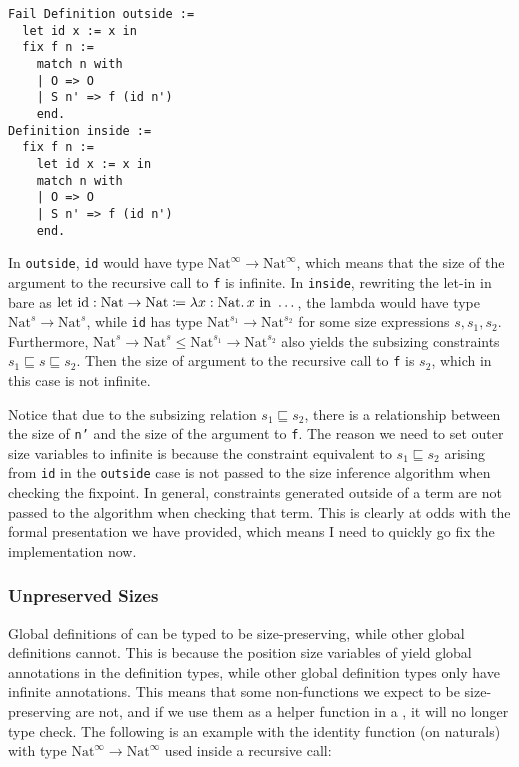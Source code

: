 \begin{verbatim}
Fail Definition outside :=
  let id x := x in
  fix f n :=
    match n with
    | O => O
    | S n' => f (id n')
    end.
Definition inside :=
  fix f n :=
    let id x := x in
    match n with
    | O => O
    | S n' => f (id n')
    end.
\end{verbatim}

In \texttt{outside}, \texttt{id} would have type $\text{Nat}^\infty \to \text{Nat}^\infty$, which means that the size of the argument to the recursive call to \texttt{f} is infinite.
In \texttt{inside}, rewriting the let-in in bare \lang as $\text{let}\ \text{id} : \text{Nat} \to \text{Nat} \coloneqq \lambda x : \text{Nat} \mathpunct{.} x\ \text{in}\ \dots$, the lambda would have type $\text{Nat}^{s} \to \text{Nat}^{s}$, while \texttt{id} has type $\text{Nat}^{s_1} \to \text{Nat}^{s_2}$ for some size expressions $s, s_1, s_2$.
Furthermore, $\text{Nat}^{s} \to \text{Nat}^{s} \leq \text{Nat}^{s_1} \to \text{Nat}^{s_2}$ also yields the subsizing constraints $s_1 \sqsubseteq s \sqsubseteq s_2$.
Then the size of argument to the recursive call to \texttt{f} is $s_2$, which in this case is not infinite.

Notice that due to the subsizing relation $s_1 \sqsubseteq s_2$, there is a relationship between the size of \texttt{n'} and the size of the argument to \texttt{f}. The reason we need to set outer size variables to infinite is because the constraint equivalent to $s_1 \sqsubseteq s_2$ arising from \texttt{id} in the \texttt{outside} case is not passed to the size inference algorithm when checking the fixpoint.
In general, constraints generated outside of a term are not passed to the algorithm when checking that term.
This is clearly at odds with the formal presentation we have provided, which means I need to quickly go fix the implementation now.

\subsubsection{Unpreserved Sizes}

Global definitions of \cofixpoints can be typed to be size-preserving, while other global definitions cannot.
This is because the position size variables of \cofixpoints yield global annotations in the definition types, while other global definition types only have infinite annotations.
This means that some non-\cofixpoint functions we expect to be size-preserving are not, and if we use them as a helper function in a \cofixpoint, it will no longer type check.
The following is an example with the identity function (on naturals) with type $\text{Nat}^\infty \to \text{Nat}^\infty$ used inside a recursive call:

